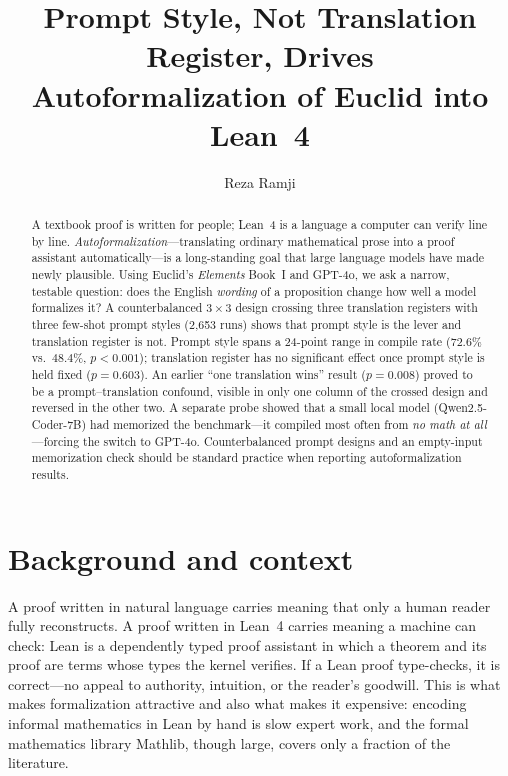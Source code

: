 \documentclass[11pt]{article}
\title{\bfseries Prompt Style, Not Translation Register, Drives\\
Autoformalization of Euclid into Lean~4}
\author{Reza Ramji}
\date{}
\begin{document}
\maketitle

\begin{abstract}
\noindent
A textbook proof is written for people; Lean~4 is a language a computer can
verify line by line. \emph{Autoformalization}---translating ordinary
mathematical prose into a proof assistant automatically---is a long-standing
goal that large language models have made newly plausible. Using Euclid's
\emph{Elements} Book~I and GPT-4o, we ask a narrow, testable question: does the
English \emph{wording} of a proposition change how well a model formalizes it?
A counterbalanced $3\times3$ design crossing three translation registers with
three few-shot prompt styles (2{,}653 runs) shows that prompt style is the lever
and translation register is not. Prompt style spans a 24-point range in compile
rate ($72.6\%$ vs.\ $48.4\%$, $p<0.001$); translation register has no
significant effect once prompt style is held fixed ($p=0.603$). An earlier
``one translation wins'' result ($p=0.008$) proved to be a prompt--translation
confound, visible in only one column of the crossed design and reversed in the
other two. A separate probe showed that a small local model
(Qwen2.5-Coder-7B) had memorized the benchmark---it compiled most often from
\emph{no math at all}---forcing the switch to GPT-4o. Counterbalanced prompt
designs and an empty-input memorization check should be standard practice when
reporting autoformalization results.
\end{abstract}

\section{Background and context}

A proof written in natural language carries meaning that only a human reader
fully reconstructs. A proof written in Lean~4 carries meaning a machine can
check: Lean is a dependently typed proof assistant in which a theorem and its
proof are terms whose types the kernel verifies. If a Lean proof type-checks, it
is correct---no appeal to authority, intuition, or the reader's goodwill. This
is what makes formalization attractive and also what makes it expensive:
encoding informal mathematics in Lean by hand is slow expert work, and the
formal mathematics library Mathlib, though large, covers only a fraction of the
literature.
\end{document}
